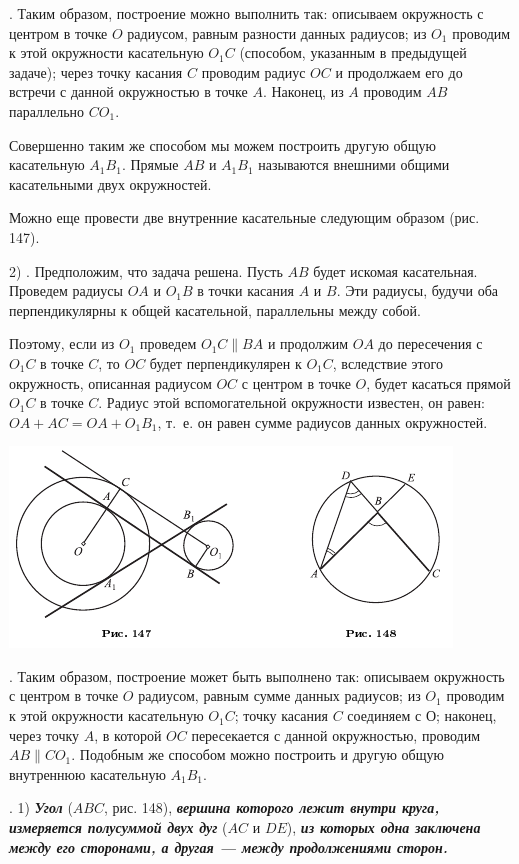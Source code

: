 \documentclass[oneside]{book}
\begin{document}
.
Таким образом, построение можно выполнить так:
описываем окружность с центром в точке $O$ радиусом, равным разности данных радиусов;
из $O_1$ проводим к этой окружности касательную $O_1C$ (способом, указанным в предыдущей задаче);
через точку касания $C$ проводим радиус $OC$ и продолжаем его до встречи с данной окружностью в точке $A$.
Наконец, из $A$ проводим $AB$ параллельно $CO_1$.

Совершенно таким же способом мы можем построить другую общую касательную $A_1B_1$.
Прямые $AB$ и $A_1B_1$ называются внешними общими касательными двух окружностей.

Можно еще провести две внутренние касательные следующим образом (рис. 147).

2) .
Предположим, что задача решена.
Пусть $AB$ будет искомая касательная.
Проведем радиусы $OA$ и $O_1B$ в точки касания $A$ и $B$.
Эти радиусы, будучи оба перпендикулярны к общей касательной, параллельны между собой.

Поэтому, если из $O_1$ проведем $O_1C\parallel BA$ и продолжим $OA$ до пересечения с $O_1C$ в точке $C$, то $OC$ будет перпендикулярен к $O_1C$, вследствие этого окружность, описанная радиусом $OC$ с центром в точке $O$, будет касаться прямой $O_1C$ в точке $C$.
Радиус этой вспомогательной окружности известен, он равен:
$OA+AC=OA+O_1B_1$, т.~е.
он равен сумме радиусов данных окружностей.

\includegraphics{pics/ris-147-148}

.
Таким образом, построение может быть выполнено так:
описываем окружность с центром в точке $O$ радиусом, равным сумме данных радиусов;
из $O_1$ проводим к этой окружности касательную $O_1C$;
точку касания $C$ соединяем с О;
наконец, через точку $A$, в которой $OC$ пересекается с данной окружностью, проводим $AB \parallel CO_1$.
Подобным же способом можно построить и другую общую внутреннюю касательную $A_1B_1$.

.
1) \textbf{\emph{Угол}} ($ABC$, рис. 148), \textbf{\emph{вершина которого лежит внутри круга, измеряется полусуммой двух дуг}} ($AC$ и $DE$), \textbf{\emph{из которых одна заключена между его сторонами, а другая — между продолжениями сторон.}}
\end{document}

